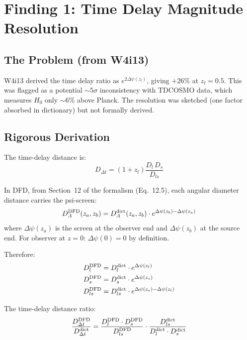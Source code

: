 \documentclass[11pt,a4paper]{article}
\newcommand{\Dpsi}{\Delta\psi}
\begin{document}
\section{Finding 1: Time Delay Magnitude Resolution}
\label{sec:time-delay-resolution}

\subsection{The Problem (from W4i13)}

W4i13 derived the time delay ratio as $e^{2\Dpsi(z_l)}$, giving
$+26\%$ at $z_l = 0.5$.  This was flagged as a potential $\sim 5\sigma$
inconsistency with TDCOSMO data, which measures $H_0$ only $\sim 6\%$
above Planck.  The resolution was sketched (one factor absorbed in
dictionary) but not formally derived.

\subsection{Rigorous Derivation}

The time-delay distance is:
\begin{equation}
D_{\Delta t} = (1+z_l) \frac{D_l \, D_s}{D_{ls}}
\end{equation}

In DFD, from Section~12 of the formalism (Eq.~12.5), each angular
diameter distance carries the psi-screen:
\begin{equation}
D_A^{\rm DFD}(z_a, z_b) = D_A^{\rm dict}(z_a, z_b) \cdot
e^{\Dpsi(z_b) - \Dpsi(z_a)}
\label{eq:DA-DFD-general}
\end{equation}
where $\Dpsi(z_a)$ is the screen at the observer end and $\Dpsi(z_b)$
at the source end.  For observer at $z=0$: $\Dpsi(0) = 0$ by definition.

Therefore:
\begin{align}
D_l^{\rm DFD} &= D_l^{\rm dict} \cdot e^{\Dpsi(z_l)} \\
D_s^{\rm DFD} &= D_s^{\rm dict} \cdot e^{\Dpsi(z_s)} \\
D_{ls}^{\rm DFD} &= D_{ls}^{\rm dict} \cdot e^{\Dpsi(z_s) - \Dpsi(z_l)}
\end{align}

The time-delay distance ratio:
\begin{equation}
\frac{D_{\Delta t}^{\rm DFD}}{D_{\Delta t}^{\rm dict}}
= \frac{D_l^{\rm DFD} \cdot D_s^{\rm DFD}}{D_{ls}^{\rm DFD}}
\cdot \frac{D_{ls}^{\rm dict}}{D_l^{\rm dict} \cdot D_s^{\rm dict}}
\end{equation}
\end{document}
